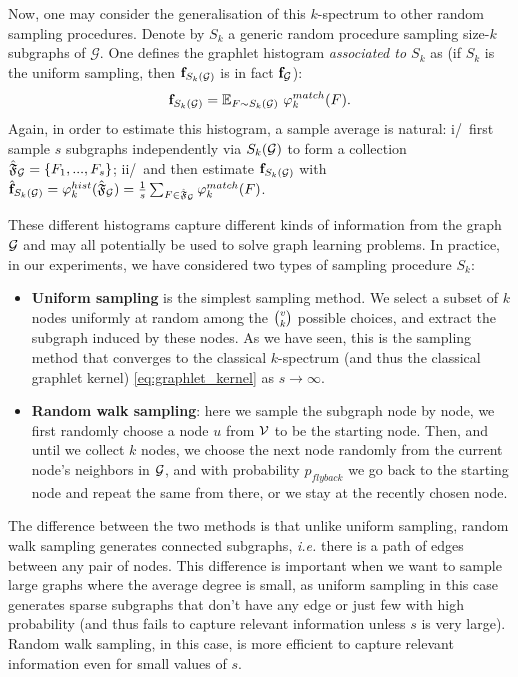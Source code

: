 Now, one may consider the generalisation of this $k$-spectrum to other random sampling procedures. Denote by $S_k$ a generic random procedure sampling size-$k$ subgraphs of $\mathcal{G}$. One defines the graphlet histogram \emph{associated to $S_k$} as (if $S_k$ is the uniform sampling, then $\mathbf{f}_{S_k(\mathcal{G})}$ is in fact $\mathbf{f}_{\mathcal{G}}$):
$$\mathbf{f}_{S_k(\mathcal{G})} = \mathbb{E}_{F \sim S_k(\mathcal{G})}~ \varphi^{match}_k(F).$$
Again, in order to estimate this histogram, a sample average is natural: i/~first sample $s$ subgraphs independently via $S_k(\mathcal{G})$ to form a collection $\hat{\mathfrak{F}}_{\mathcal{G}}=\{F_1,...,F_s\}$;
ii/~and then estimate $\mathbf{f}_{S_k(\mathcal{G})}$ with $\hat{\mathbf{f}}_{S_k(\mathcal{G})} = \varphi_k^{hist}(\hat{\mathfrak{F}}_{\mathcal{G}})= \frac{1}{s}\sum_{F\in\hat{\mathfrak{F}}_{\mathcal{G}}} \varphi^{match}_k(F)$. 

These different histograms capture different kinds of information from the graph $\mathcal{G}$ and may all potentially be used to solve graph learning problems. In practice, in our experiments, we have considered two types of sampling procedure $S_k$:
\begin{itemize}
	\item \textbf{Uniform sampling} is the simplest sampling method. We select a subset of $k$ nodes uniformly at random among the $\tbinom{v}{k}$ possible choices, and extract the subgraph induced by these nodes. As we have seen, this is the sampling method that converges to the classical $k$-spectrum (and thus the classical graphlet kernel) \eqref{eq:graphlet_kernel} as $s \to \infty$.
	\item \textbf{Random walk sampling}: here we sample the subgraph node by node, we first randomly choose a node $u$ from $\mathcal{V}$ to be the starting node. Then, and until we collect $k$ nodes, we choose the next node randomly from the current node's neighbors in $\mathcal{G}$, and with probability $p_{flyback}$ we go back to the starting node and repeat the same from there, or we stay at the recently chosen node.
\end{itemize}
The difference between the two methods is that unlike uniform sampling, random walk sampling generates  connected subgraphs, \emph{i.e.} there is a path of edges between any pair of nodes. This difference is important when we want to sample large graphs where the average degree is small, as uniform sampling in this case generates sparse subgraphs that don't have any edge or just few with high probability (and thus fails to capture relevant information unless $s$ is very large). Random walk sampling, in this case, is more efficient to capture relevant information even for small values of $s$.

